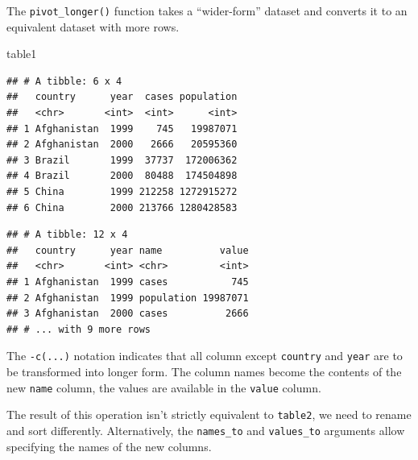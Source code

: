 \documentclass[]{book}
\newenvironment{Shaded}{}{}
\newcommand{\DataTypeTok}[1]{#1}
\newcommand{\KeywordTok}[1]{\textcolor[rgb]{0.00,0.00,1.00}{#1}}
\newcommand{\NormalTok}[1]{#1}
\newcommand{\OperatorTok}[1]{#1}
\newcommand{\StringTok}[1]{\textcolor[rgb]{0.00,0.50,0.50}{#1}}
\begin{document}
The \texttt{pivot\_longer()} function takes a ``wider-form'' dataset and converts it to an equivalent dataset with more rows.

\begin{Shaded}
\begin{Highlighting}[]
\NormalTok{table1}
\end{Highlighting}
\end{Shaded}

\begin{verbatim}
## # A tibble: 6 x 4
##   country      year  cases population
##   <chr>       <int>  <int>      <int>
## 1 Afghanistan  1999    745   19987071
## 2 Afghanistan  2000   2666   20595360
## 3 Brazil       1999  37737  172006362
## 4 Brazil       2000  80488  174504898
## 5 China        1999 212258 1272915272
## 6 China        2000 213766 1280428583
\end{verbatim}

\begin{Shaded}
\end{Shaded}

\begin{verbatim}
## # A tibble: 12 x 4
##   country      year name          value
##   <chr>       <int> <chr>         <int>
## 1 Afghanistan  1999 cases           745
## 2 Afghanistan  1999 population 19987071
## 3 Afghanistan  2000 cases          2666
## # ... with 9 more rows
\end{verbatim}

The \texttt{-c(...)} notation indicates that all column except \texttt{country} and \texttt{year} are to be transformed into longer form.
The column names become the contents of the new \texttt{name} column, the values are available in the \texttt{value} column.

The result of this operation isn't strictly equivalent to \texttt{table2}, we need to rename and sort differently.
Alternatively, the \texttt{names\_to} and \texttt{values\_to} arguments allow specifying the names of the new columns.

\begin{Shaded}
\end{Shaded}
\end{document}
